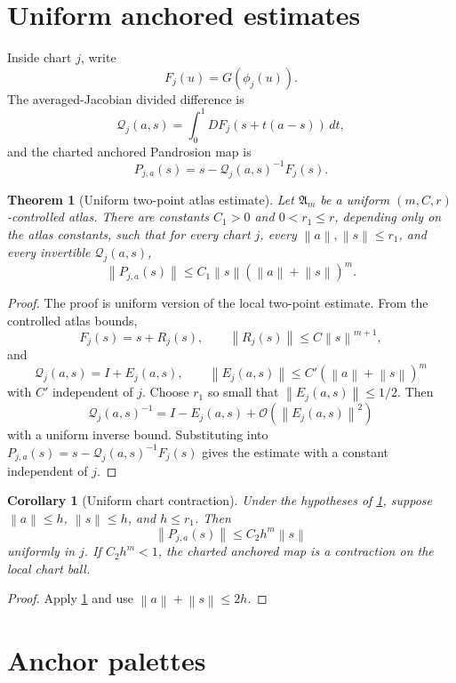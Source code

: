 \documentclass[11pt]{article}
\newtheorem{theorem}[definition]{Theorem}
\newtheorem{corollary}[definition]{Corollary}
\newcommand{\Oterm}{\mathcal O}
\newcommand{\Q}{\mathcal Q}
\newcommand{\A}{\mathfrak A}
\newcommand{\norm}[1]{\left\lVert #1\right\rVert}
\begin{document}
\section{Uniform anchored estimates}

Inside chart \(j\), write
\[
        F_j(u)=G(\phi_j(u)).
\]
The averaged-Jacobian divided difference is
\[
        \Q_j(a,s)=\int_0^1 DF_j(s+t(a-s))\,dt,
\]
and the charted anchored Pandrosion map is
\[
        P_{j,a}(s)=s-\Q_j(a,s)^{-1}F_j(s).
\]

\begin{theorem}[Uniform two-point atlas estimate]\label{thm:uniform-two-point}
Let \(\A_m\) be a uniform \((m,C,r)\)-controlled atlas. There are constants \(C_1>0\) and \(0<r_1\le r\), depending only on the atlas constants, such that for every chart \(j\), every \(\norm{a},\norm{s}\le r_1\), and every invertible \(\Q_j(a,s)\),
\[
        \norm{P_{j,a}(s)}
        \le
        C_1\norm{s}(\norm{a}+\norm{s})^m.
\]
\end{theorem}

\begin{proof}
The proof is uniform version of the local two-point estimate. From the controlled atlas bounds,
\[
        F_j(s)=s+R_j(s),\qquad \norm{R_j(s)}\le C\norm{s}^{m+1},
\]
and
\[
        \Q_j(a,s)=I+E_j(a,s),\qquad
        \norm{E_j(a,s)}\le C'(\norm{a}+\norm{s})^m
\]
with \(C'\) independent of \(j\). Choose \(r_1\) so small that \(\norm{E_j(a,s)}\le 1/2\). Then
\[
        \Q_j(a,s)^{-1}=I-E_j(a,s)+\Oterm(\norm{E_j(a,s)}^2)
\]
with a uniform inverse bound. Substituting into \(P_{j,a}(s)=s-\Q_j(a,s)^{-1}F_j(s)\) gives the estimate with a constant independent of \(j\).
\end{proof}

\begin{corollary}[Uniform chart contraction]\label{cor:contraction}
Under the hypotheses of \cref{thm:uniform-two-point}, suppose \(\norm{a}\le h\), \(\norm{s}\le h\), and \(h\le r_1\). Then
\[
        \norm{P_{j,a}(s)}\le C_2 h^m\norm{s}
\]
uniformly in \(j\). If \(C_2h^m<1\), the charted anchored map is a contraction on the local chart ball.
\end{corollary}

\begin{proof}
Apply \cref{thm:uniform-two-point} and use \(\norm{a}+\norm{s}\le2h\).
\end{proof}

\section{Anchor palettes}
\end{document}
